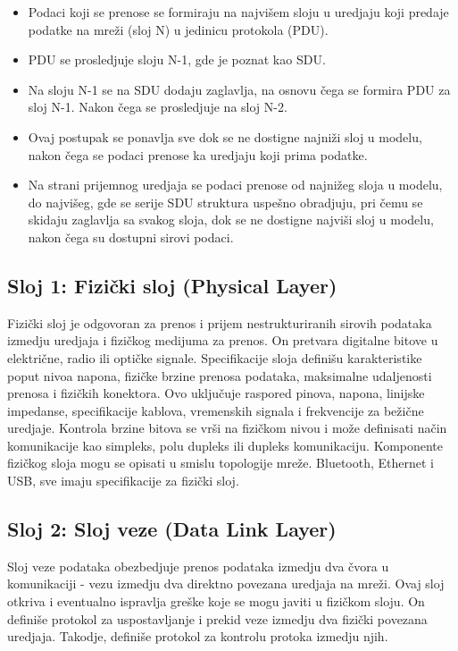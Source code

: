 \documentclass[a4paper,12pt, master]{etf}
\begin{document}
	\begin{itemize}
		\item Podaci koji se prenose se formiraju na najvi\v{s}em sloju u 
		uredjaju koji predaje podatke na mre\v{z}i (sloj N) u jedinicu 
		protokola (PDU).
		\item PDU se prosledjuje sloju N-1, gde je poznat kao SDU.
		\item Na sloju N-1 se na SDU dodaju zaglavlja, na osnovu \v{c}ega se 
		formira PDU za sloj N-1. Nakon \v{c}ega se prosledjuje na sloj N-2.
		\item Ovaj postupak se ponavlja sve dok se ne dostigne najni\v{z}i sloj 
		u modelu, nakon	\v{c}ega se podaci prenose ka uredjaju koji prima 
		podatke.
		\item Na strani prijemnog uredjaja se podaci prenose od najni\v{z}eg 
		sloja u modelu, do najvi\v{s}eg, gde se serije SDU struktura 
		uspe\v{s}no obradjuju, pri \v{c}emu se skidaju zaglavlja sa svakog 
		sloja, dok se ne dostigne najvi\v{s}i sloj u modelu, nakon \v{c}ega su 
		dostupni sirovi podaci.
	\end{itemize}

	\subsection{Sloj 1: Fizi\v{c}ki sloj (Physical Layer)}

	Fizi\v{c}ki sloj je odgovoran za prenos i prijem nestrukturiranih sirovih 
	podataka izmedju uredjaja i fizi\v{c}kog medijuma za prenos. On pretvara 
	digitalne bitove u elektri\v{c}ne, radio ili opti\v{c}ke signale. 
	Specifikacije sloja defini\v{s}u karakteristike poput nivoa napona,
	fizi\v{c}ke brzine prenosa podataka, maksimalne udaljenosti prenosa i 
	fizi\v{c}kih konektora. Ovo	uklju\v{c}uje raspored pinova, napona, linijske 
	impedanse, specifikacije kablova, vremenskih signala i frekvencije za 
	be\v{z}i\v{c}ne uredjaje. Kontrola brzine bitova se vr\v{s}i na fizi\v{c}kom
	nivou i mo\v{z}e definisati na\v{c}in komunikacije kao simpleks, polu 
	dupleks ili dupleks	komunikaciju. Komponente fizi\v{c}kog sloja mogu se 
	opisati u smislu topologije mre\v{z}e. Bluetooth, Ethernet i USB, sve imaju 
	specifikacije za fizi\v{c}ki sloj.

	\subsection{Sloj 2: Sloj veze (Data Link Layer)}

	Sloj veze podataka obezbedjuje prenos podataka izmedju dva \v{c}vora u 
	komunikaciji - vezu	izmedju dva direktno povezana uredjaja na mre\v{z}i. 
	Ovaj sloj otkriva i eventualno ispravlja gre\v{s}ke koje se mogu javiti u 
	fizi\v{c}kom sloju. On defini\v{s}e protokol za uspostavljanje i prekid 
	veze izmedju dva fizi\v{c}ki povezana uredjaja. Takodje, defini\v{s}e 
	protokol za kontrolu protoka izmedju njih.
\end{document}
